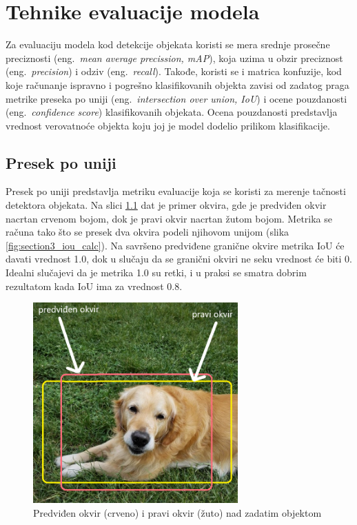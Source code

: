 \documentclass[12pt,oneside]{memoir}
\begin{document}
\chapter{Tehnike evaluacije modela}
\label{section4}
Za evaluaciju modela kod detekcije objekata koristi se mera srednje prosečne preciznosti (eng.~\textit{mean average precission, mAP}), koja uzima u obzir preciznost (eng.~\textit{precision}) i odziv (eng.~\textit{recall}). Takođe, koristi se i matrica konfuzije, kod koje računanje ispravno i pogrešno klasifikovanih objekta zavisi od zadatog praga metrike preseka po uniji (eng.~\textit{intersection over union, IoU}) i ocene pouzdanosti (eng.~\textit{confidence score}) klasifikovanih objekata. Ocena pouzdanosti predstavlja vrednost verovatnoće objekta koju joj je model dodelio prilikom klasifikacije.


\section{Presek po uniji}
Presek po uniji predstavlja metriku evaluacije koja se koristi za merenje tačnosti detektora objekata. Na slici \ref{fig:section3_iou} dat je primer okvira, gde je predviđen okvir nacrtan crvenom bojom, dok je pravi okvir nacrtan žutom bojom. Metrika se računa tako što se presek dva okvira podeli njihovom unijom (slika \ref{fig:section3_iou_calc}). Na savršeno predviđene granične okvire metrika IoU će davati vrednost 1.0, dok u slučaju da se granični okviri ne seku vrednost će biti 0. Idealni slučajevi da je metrika 1.0 su retki, i u praksi se smatra dobrim rezultatom kada IoU ima za vrednost 0.8.

\begin{figure}[!ht]
    \centering
    \includegraphics[width=0.7\textwidth]{matfmaster/glava3/iou_cus.png}
    \caption{Predviđen okvir (crveno) i pravi okvir (žuto) nad zadatim objektom}
    \label{fig:section3_iou}
\end{figure}
\end{document}
